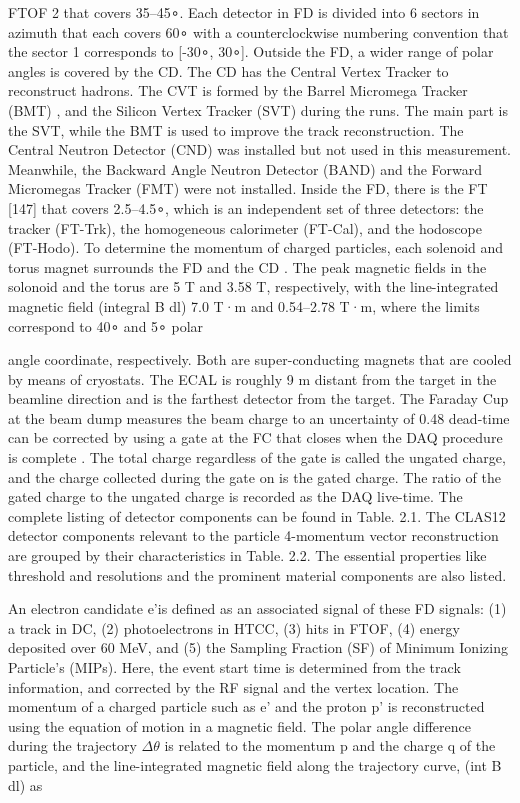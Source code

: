 FTOF 2 that covers 35–45∘. Each detector in FD is divided into 6 sectors in azimuth
that each covers 60∘ with a counterclockwise numbering convention that the sector 1
corresponds to [-30∘, 30∘].
Outside the FD, a wider range of polar angles is covered by the CD. The CD
has the Central Vertex Tracker to reconstruct hadrons. The CVT is formed by the
Barrel Micromega Tracker (BMT)  \parencite{Acker2020TheTracker}, and the Silicon Vertex Tracker (SVT) \parencite{Antonioli2020TheTracker}
during the runs. The main part is the SVT, while the BMT is used to improve the
track reconstruction. The Central Neutron Detector (CND) \parencite{Chatagnon2020TheDetector} was installed but
not used in this measurement. Meanwhile, the Backward Angle Neutron Detector
(BAND) \parencite{Segarra2020TheBAND} and the Forward Micromegas Tracker (FMT)  \parencite{Acker2020TheTracker} were not installed.
Inside the FD, there is the FT [147] that covers 2.5–4.5∘, which is an independent
set of three detectors: the tracker (FT-Trk), the homogeneous calorimeter (FT-Cal),
and the hodoscope (FT-Hodo).
To determine the momentum of charged particles, each solenoid and torus magnet
surrounds the FD and the CD  \parencite{Fair2020TheMagnets}. The peak magnetic fields in the solonoid and
the torus are 5 T and 3.58 T, respectively, with the line-integrated magnetic field
(integral B dl) 7.0 T·m and 0.54–2.78 T·m, where the limits correspond to 40∘ and 5∘ polar

angle coordinate, respectively. Both are super-conducting magnets that are cooled
by means of cryostats.
The ECAL is roughly 9 m distant from the target in the beamline direction and is
the farthest detector from the target. The Faraday Cup at the beam dump measures
the beam charge to an uncertainty of 0.48%
\parencite{Boyarinov2020TheSystem} dead-time can be corrected by using a gate at the FC that closes when the
DAQ procedure is complete \parencite{Baltzell2020ThePerformance}. The total charge regardless of the gate is called
the ungated charge, and the charge collected during the gate on is the gated charge.
The ratio of the gated charge to the ungated charge is recorded as the DAQ live-time.
The complete listing of detector components can be found in Table. 2.1. The CLAS12
detector components relevant to the particle 4-momentum vector reconstruction are
grouped by their characteristics in Table. 2.2. The essential properties like threshold
and resolutions and the prominent material components are also listed.

An electron candidate e'is defined as an associated signal of these FD signals: (1)
a track in DC, (2) photoelectrons in HTCC, (3) hits in FTOF, (4) energy deposited
over 60 MeV, and (5) the Sampling Fraction (SF) of Minimum Ionizing Particle’s
(MIPs). Here, the event start time is determined from the track information, and
corrected by the RF signal and the vertex location. The momentum of a charged
particle such as e' and the proton p' is reconstructed using the equation of motion
in a magnetic field. The polar angle difference during the trajectory $\Delta \theta$ is related to
the momentum p and the charge q of the particle, and the line-integrated magnetic
field along the trajectory curve, (int B dl) as

